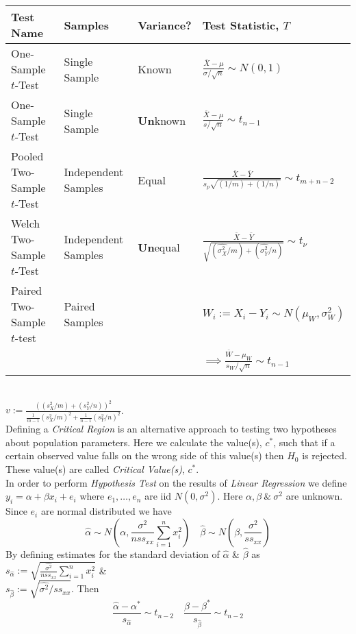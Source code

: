 \documentclass[11pt,a4paper]{article}
\begin{document}
\begin{tabular}{|l|l|l|l|}
\hline Test Name&Samples&Variance?&Test Statistic, $T$\\
\hline One-Sample $t$-Test&Single Sample&Known&$\frac{\overline{X}-\mu}{\sigma/\sqrt{n}}\sim N(0,1)$\\\hline
One-Sample $t$-Test&Single Sample&\textbf{Un}known&$\frac{\overline{X}-\mu}{s/\sqrt{n}}\sim t_{n-1}$\\\hline
Pooled Two-Sample $t$-Test&Independent Samples&Equal&$\frac{\overline{X}-\overline{Y}}{s_p\sqrt{(1/m)+(1/n)}}\sim t_{m+n-2}$\\\hline
Welch Two-Sample $t$-Test&Independent Samples&\textbf{Un}equal&$\frac{\overline{X}-\overline{Y}}{\sqrt{(\widehat{\sigma^2_X}/m)+(\widehat{\sigma^2_Y}/n)}}\sim t_\nu$\\\hline
Paired Two-Sample $t$-test&Paired Samples&&$W_i:=X_i-Y_i\sim N(\mu_W,\sigma^2_W)$\\
&&&$\implies\frac{\overline{W}-\mu_W}{s_W/\sqrt{n}}\sim t_{n-1}$\\\hline
\end{tabular}\\
\NB $v:=\displaystyle{\frac{((s_X^2/m)+(s_Y^2/n))^2}{\frac{1}{m-1}(s_X^2/m)^2+\frac{1}{n-1}(s_Y^2/n)^2}}$.\\

Defining a \textit{Critical Region} is an alternative approach to testing two hypotheses about population parameters. Here we calculate the value(s), $c^*$, such that if a certain observed value falls on the wrong side of this value(s) then $H_0$ is rejected. These value(s) are called \textit{Critical Value(s)}, $c^*$.\\

In order to perform \textit{Hypothesis Test} on the results of \textit{Linear Regression} we define $y_i=\alpha+\beta x_i+e_i$ where $e_1,\dots,e_n$ are iid $N(0,\sigma^2)$. Here $\alpha,\beta\ \&\ \sigma^2$ are unknown. Since $e_i$ are normal distributed we have
$$\hat{\alpha}\sim N\left(\alpha,\frac{\sigma^2}{nss_{xx}}\sum_{i=1}^nx_i^2\right)\quad\hat{\beta}\sim N\left(\beta,\frac{\sigma^2}{ss_{xx}}\right)$$
By defining estimates for the standard deviation of $\hat{\alpha}$ \& $\hat{\beta}$ as $s_{\hat{\alpha}}:=\sqrt{\frac{\widehat{\sigma^2}}{nss_{xx}}\sum_{i=1}^nx_i^2}$ \&\\ $s_{\hat{\beta}}:=\sqrt{\widehat{\sigma^2}/ss_{xx}}$. Then
$$\frac{\hat{\alpha}-\alpha^*}{s_{\hat{\alpha}}}\sim t_{n-2}\quad\frac{\hat{\beta}-\beta^*}{s_{\hat{\beta}}}\sim t_{n-2}$$
\newpage
\setcounter{section}{-1}
\end{document}
